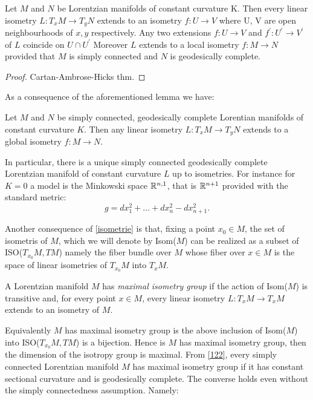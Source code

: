 \begin{lemma}\label{isometrie} Let $M$ and $N$ be Lorentzian manifolds of constant curvature K. Then every linear isometry $L:T_{x}M\to T_yN$ extends to an isometry $f:U\to V$ where U, V are open neighbourhoods of $x,y$ respectively. Any two extensions $f:U\to V$ and $f^{\prime}:U^{\prime} \to V^{\prime} $ of $L$ coincide on $U\cap U^{\prime} $ Moreover $L$ extends to a local isometry $f:M\to N$ provided that $M$ is simply connected and $N$ is geodesically complete. 
\begin{proof}
    Cartan-Ambrose-Hicks thm.
\end{proof}
As a consequence of the aforementioned lemma we have: 
\begin{corollary}\label{122}
    Let $M$ and $N$ be simply connected, geodesically complete Lorentian manifolds of constant curvature $K$. Then any linear isometry $L:T_xM\to T_yN$ extends to a global isometry $f:M\to N.$   
\end{corollary}

In particular, there is a unique simply connected geodesically complete Lorentzian manifold of constant curvature $L$ up to isometries. For instance for $K=0$ a model is the Minkowski space $\mathbb{R}^{n,1}$, that is $\mathbb{R}^{n+1}$ provided with the standard metric: 
\[
    g=dx_1^{2}+\dots+dx_n^{2}-dx_{n+1}^2.   
\]

Another consequence of \ref{isometrie} is that, fixing a point $x_0 \in M$, the set of isometris of $M$, which we will denote by Isom($M$) can be realized as a subset of ISO($T_{x_0}M, TM$) namely the fiber bundle over $M$ whose fiber over $x\in M$ is the space of linear isometries of $T_{x_0}M$ into $T_{x}M$. 

\begin{definition}
    A Lorentzian manifold $M$ has \textit{maximal isometry group} if the action of Isom($M$) is transitive and, for every point $x \in M$, every linear isometry $L:T_{x}M\to T_xM$ extends to an isometry of $M$. 
\end{definition}

Equivalently $M$ has maximal isometry group is the above inclusion of Isom($M$) into ISO($T_{x_0}M, TM$) is a bijection. Hence is $M$ has maximal isometry group, then the dimension of the isotropy group is maximal. 
From \ref{122}, every simply connected Lorentzian manifold $M$ has maximal isometry group if it has constant sectional curvature and is geodesically complete. The converse holds even without the simply connectedness assumption. Namely: 


\end{lemma}

